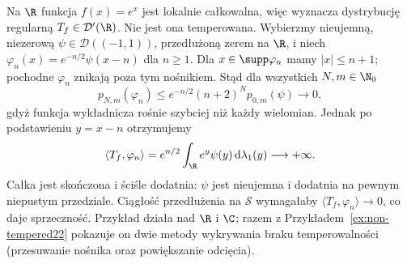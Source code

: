 \begin{przyklad}
\label{ex:non-tempered25}
Na $\R$ funkcja $f(x)=e^x$ jest lokalnie całkowalna,
więc wyznacza dystrybucję regularną $T_f\in\mathcal D'(\R)$.
Nie jest ona temperowana. Wybierzmy nieujemną, niezerową
$\psi\in\mathcal D((-1,1))$, przedłużoną zerem na $\R$,
i niech $\varphi_n(x)=e^{-n/2}\psi(x-n)$ dla $n\ge1$.
Dla $x\in\supp\varphi_n$ mamy $|x|\le n+1$; pochodne
$\varphi_n$ znikają poza tym nośnikiem. Stąd dla wszystkich
$N,m\in\N_0$
\[
 p_{N,m}(\varphi_n)\le e^{-n/2}(n+2)^N p_{0,m}(\psi)
 \longrightarrow0,
\]
gdyż funkcja wykładnicza rośnie szybciej niż każdy
wielomian. Jednak po podstawieniu $y=x-n$ otrzymujemy
\[
 \langle T_f,\varphi_n\rangle=
 e^{n/2}\int_\R e^y\psi(y)\,\mathrm d\lambda_1(y)
 \longrightarrow+\infty.
\]
Całka jest skończona i ściśle dodatnia: $\psi$ jest
nieujemna i dodatnia na pewnym niepustym przedziale.
Ciągłość przedłużenia na $\mathcal S$ wymagałaby
$\langle T_f,\varphi_n\rangle\to0$, co daje sprzeczność.
Przykład działa nad $\R$ i $\C$; razem z
Przykładem~\ref{ex:non-tempered22} pokazuje on dwie
metody wykrywania braku temperowalności (przesuwanie
nośnika oraz powiększanie odcięcia).
\end{przyklad}
